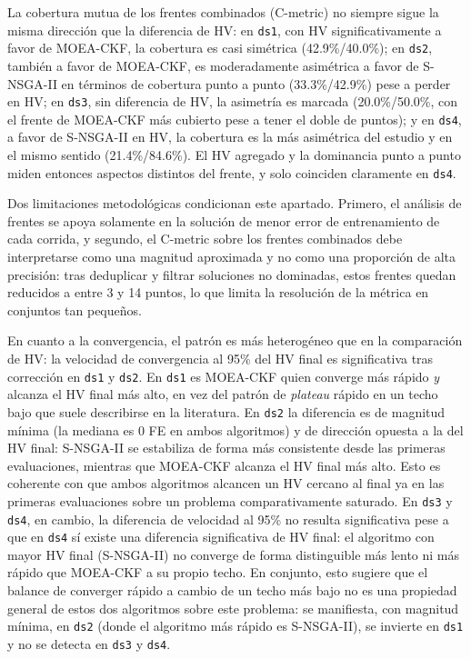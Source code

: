 La cobertura mutua de los frentes combinados (C-metric) no siempre sigue la misma dirección que la diferencia de HV: en \texttt{ds1}, con HV significativamente a favor de MOEA-CKF, la cobertura es casi simétrica (42.9\%/40.0\%); en \texttt{ds2}, también a favor de MOEA-CKF, es moderadamente asimétrica a favor de S-NSGA-II en términos de cobertura punto a punto (33.3\%/42.9\%) pese a perder en HV; en \texttt{ds3}, sin diferencia de HV, la asimetría es marcada (20.0\%/50.0\%, con el frente de MOEA-CKF más cubierto pese a tener el doble de puntos); y en \texttt{ds4}, a favor de S-NSGA-II en HV, la cobertura es la más asimétrica del estudio y en el mismo sentido (21.4\%/84.6\%). El HV agregado y la dominancia punto a punto miden entonces aspectos distintos del frente, y solo coinciden claramente en \texttt{ds4}.

Dos limitaciones metodológicas condicionan este apartado. Primero, el análisis de frentes se apoya solamente en la solución de menor error de entrenamiento de cada corrida, y segundo, el C-metric sobre los frentes combinados debe interpretarse como una magnitud aproximada y no como una proporción de alta precisión: tras deduplicar y filtrar soluciones no dominadas, estos frentes quedan reducidos a entre 3 y 14 puntos, lo que limita la resolución de la métrica en conjuntos tan pequeños.

En cuanto a la convergencia, el patrón es más heterogéneo que en la comparación de HV: la velocidad de convergencia al 95\% del HV final es significativa tras corrección en \texttt{ds1} y \texttt{ds2}. En \texttt{ds1} es MOEA-CKF quien converge más rápido \emph{y} alcanza el HV final más alto, en vez del patrón de \textit{plateau} rápido en un techo bajo que suele describirse en la literatura. En \texttt{ds2} la diferencia es de magnitud mínima (la mediana es 0 FE en ambos algoritmos) y de dirección opuesta a la del HV final: S-NSGA-II se estabiliza de forma más consistente desde las primeras evaluaciones, mientras que MOEA-CKF alcanza el HV final más alto. Esto es coherente con que ambos algoritmos alcancen un HV cercano al final ya en las primeras evaluaciones sobre un problema comparativamente saturado. En \texttt{ds3} y \texttt{ds4}, en cambio, la diferencia de velocidad al 95\% no resulta significativa pese a que en \texttt{ds4} sí existe una diferencia significativa de HV final: el algoritmo con mayor HV final (S-NSGA-II) no converge de forma distinguible más lento ni más rápido que MOEA-CKF a su propio techo. En conjunto, esto sugiere que el balance de converger rápido a cambio de un techo más bajo no es una propiedad general de estos dos algoritmos sobre este problema: se manifiesta, con magnitud mínima, en \texttt{ds2} (donde el algoritmo más rápido es S-NSGA-II), se invierte en \texttt{ds1} y no se detecta en \texttt{ds3} y \texttt{ds4}.

